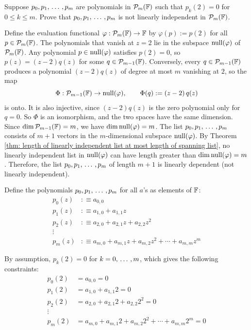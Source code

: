 \begin{xrcs}
  Suppose $p_0, p_1, {\, \ldots \,\,}, p_m$ are polynomials in $\mathcal{P}_m(\mathbb{F})$ such that $p_k(2) = 0$ for $0 \leq k \leq m$.
  Prove that $p_0, p_1, {\, \ldots \,\,}, p_m$ is not linearly independent in $\mathcal{P}_m(\mathbb{F})$.

  \begin{xprf}
    Define the evaluation functional $\varphi : \mathcal{P}_m(\mathbb{F}) \to \mathbb{F}$ by $\varphi(p) := p(2)$ for all $p \in \mathcal{P}_m(\mathbb{F})$.
    The polynomials that vanish at $z=2$ lie in the subspace $\operatorname{null}(\varphi)$ of $\mathcal{P}_m(\mathbb{F})$.
    Any polynomial $p \in \operatorname{null}(\varphi)$ satisfies $p(2) = 0$, so $p(z) = (z-2) q(z)$ for some $q \in \mathcal{P}_{m-1}(\mathbb{F})$.
    Conversely, every $q \in \mathcal{P}_{m-1}(\mathbb{F})$ produces a polynomial $(z-2)q(z)$ of degree at most $m$ vanishing at $2$, so the map
    \begin{equation}
      \Phi : \mathcal{P}_{m-1}(\mathbb{F}) \to \operatorname{null}(\varphi), \qquad \Phi(q) := (z-2)\,q(z)
    \end{equation}
    is onto. It is also injective, since $(z-2)q(z)$ is the zero polynomial only for $q = 0$. So $\Phi$ is an isomorphism, and the two spaces have the same dimension.
    Since $\dim \mathcal{P}_{m-1}(\mathbb{F}) = m$, we have $\dim \operatorname{null}(\varphi) = m$.
    The list $p_0, p_1, {\, \ldots \,\,}, p_m$ consists of $m+1$ vectors in the $m$-dimensional subspace $\operatorname{null}(\varphi)$.
    By Theorem \ref{thm: length of linearly independent list at most length of spanning list}, no linearly independent list in $\operatorname{null}(\varphi)$ can have length greater than $\dim \operatorname{null}(\varphi) = m$.
    Therefore, the list $p_0, p_1, {\, \ldots \,\,}, p_m$ of length $m+1$ is linearly dependent (not linearly independent).
  \end{xprf}

  \begin{failedattempt}
    Define the polynomials $p_0, p_1, {\, \ldots \,\,}, p_m$ for all $a$'s as elements of $\mathbb{F}$:
    \[
    \begin{aligned}
      p_0(z) &:\equiv a_{0,0}  \\
      p_1(z) &:\equiv a_{1,0} + a_{1,1} z  \\
      p_2(z) &:\equiv a_{2,0} + a_{2,1} z + a_{2,2} z^2  \\
      \vdots & \quad \\
      p_m(z) &:\equiv a_{m,0} + a_{m,1} z + a_{m,2} z^2 + \cdots + a_{m,m} z^m
    \end{aligned}
    \]

    By assumption, $p_k(2) = 0$ for $k = 0, {\, \ldots \,\,}, m$, which gives the following constraints:
    \[
    \begin{aligned}
      p_0(2) &= a_{0,0} = 0 \\
      p_1(2) &= a_{1,0} + a_{1,1} 2 = 0 \\
      p_2(2) &= a_{2,0} + a_{2,1} 2 + a_{2,2} 2^2  = 0  \\
      \vdots & \quad \\
      p_m(2) &= a_{m,0} + a_{m,1} 2 + a_{m,2} 2^2 + \cdots + a_{m,m} 2^m  = 0
    \end{aligned}
    \]


\end{failedattempt}
\end{xrcs}
